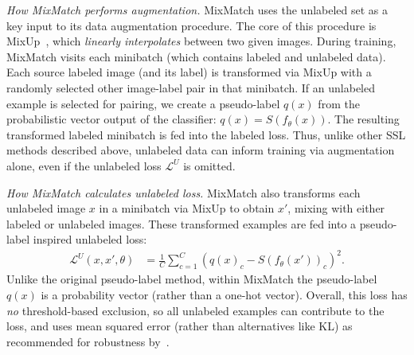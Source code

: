 \textit{How MixMatch performs augmentation.}
MixMatch uses the unlabeled set as a key input to its data augmentation procedure. 
The core of this procedure is MixUp~\citep{zhangMixupEmpiricalRisk2017}, which \emph{linearly interpolates} between two given images.
During training, MixMatch visits each minibatch (which contains labeled and unlabeled data). 
Each source labeled image (and its label) is transformed via MixUp with a randomly selected other image-label pair in that minibatch.
If an unlabeled example is selected for pairing, we create a pseudo-label $q(x)$ from the probabilistic vector output of the classifier: $q(x) = S( f_{\theta}(x))$. 
The resulting transformed labeled minibatch is fed into the labeled loss.
Thus, unlike other SSL methods described above, unlabeled data can inform training via augmentation alone, even if the unlabeled loss $\mathcal{L}^U$ is omitted.


\textit{How MixMatch calculates unlabeled loss.}
MixMatch also transforms each unlabeled image $x$ in a  minibatch via MixUp to obtain $x'$, mixing with either labeled or unlabeled images.
These transformed examples are fed into a pseudo-label inspired unlabeled loss:
\begin{align}
\mathcal{L}^U(x, x', \theta) &= \frac{1}{C} \sum_{c=1}^{C} \left( q(x)_c - S(f_{\theta}(x'))_c \right)^2.
\end{align}
Unlike the original pseudo-label method, within MixMatch the pseudo-label $q(x)$ is a probability vector (rather than a one-hot vector).
Overall, this loss has \emph{no} threshold-based exclusion, so all unlabeled examples can contribute to the loss, and uses mean squared error (rather than alternatives like KL) as recommended for robustness by~\citet{berthelotMixmatchHolisticApproach2019}.



